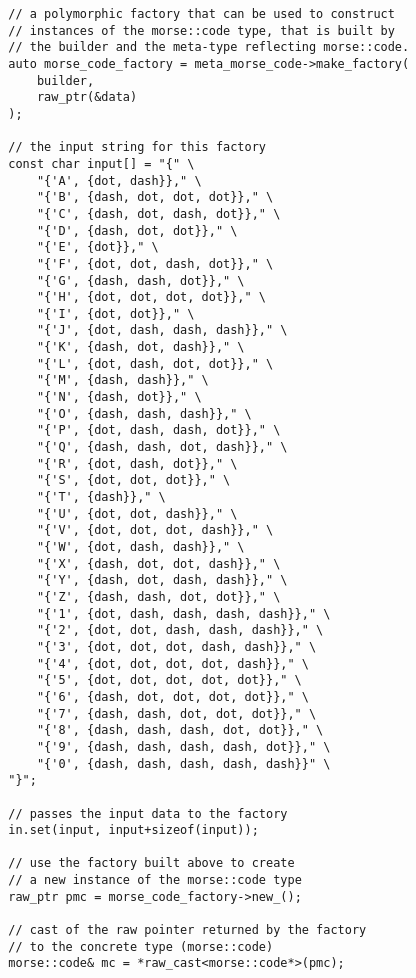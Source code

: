 \begin{lstlisting}
        // a polymorphic factory that can be used to construct
        // instances of the morse::code type, that is built by
        // the builder and the meta-type reflecting morse::code.
        auto morse_code_factory = meta_morse_code->make_factory(
            builder,
            raw_ptr(&data)
        );

        // the input string for this factory
        const char input[] = "{" \
            "{'A', {dot, dash}}," \
            "{'B', {dash, dot, dot, dot}}," \
            "{'C', {dash, dot, dash, dot}}," \
            "{'D', {dash, dot, dot}}," \
            "{'E', {dot}}," \
            "{'F', {dot, dot, dash, dot}}," \
            "{'G', {dash, dash, dot}}," \
            "{'H', {dot, dot, dot, dot}}," \
            "{'I', {dot, dot}}," \
            "{'J', {dot, dash, dash, dash}}," \
            "{'K', {dash, dot, dash}}," \
            "{'L', {dot, dash, dot, dot}}," \
            "{'M', {dash, dash}}," \
            "{'N', {dash, dot}}," \
            "{'O', {dash, dash, dash}}," \
            "{'P', {dot, dash, dash, dot}}," \
            "{'Q', {dash, dash, dot, dash}}," \
            "{'R', {dot, dash, dot}}," \
            "{'S', {dot, dot, dot}}," \
            "{'T', {dash}}," \
            "{'U', {dot, dot, dash}}," \
            "{'V', {dot, dot, dot, dash}}," \
            "{'W', {dot, dash, dash}}," \
            "{'X', {dash, dot, dot, dash}}," \
            "{'Y', {dash, dot, dash, dash}}," \
            "{'Z', {dash, dash, dot, dot}}," \
            "{'1', {dot, dash, dash, dash, dash}}," \
            "{'2', {dot, dot, dash, dash, dash}}," \
            "{'3', {dot, dot, dot, dash, dash}}," \
            "{'4', {dot, dot, dot, dot, dash}}," \
            "{'5', {dot, dot, dot, dot, dot}}," \
            "{'6', {dash, dot, dot, dot, dot}}," \
            "{'7', {dash, dash, dot, dot, dot}}," \
            "{'8', {dash, dash, dash, dot, dot}}," \
            "{'9', {dash, dash, dash, dash, dot}}," \
            "{'0', {dash, dash, dash, dash, dash}}" \
        "}";

        // passes the input data to the factory
        in.set(input, input+sizeof(input));

        // use the factory built above to create
        // a new instance of the morse::code type
        raw_ptr pmc = morse_code_factory->new_();

        // cast of the raw pointer returned by the factory
        // to the concrete type (morse::code)
        morse::code& mc = *raw_cast<morse::code*>(pmc);


\end{lstlisting}
